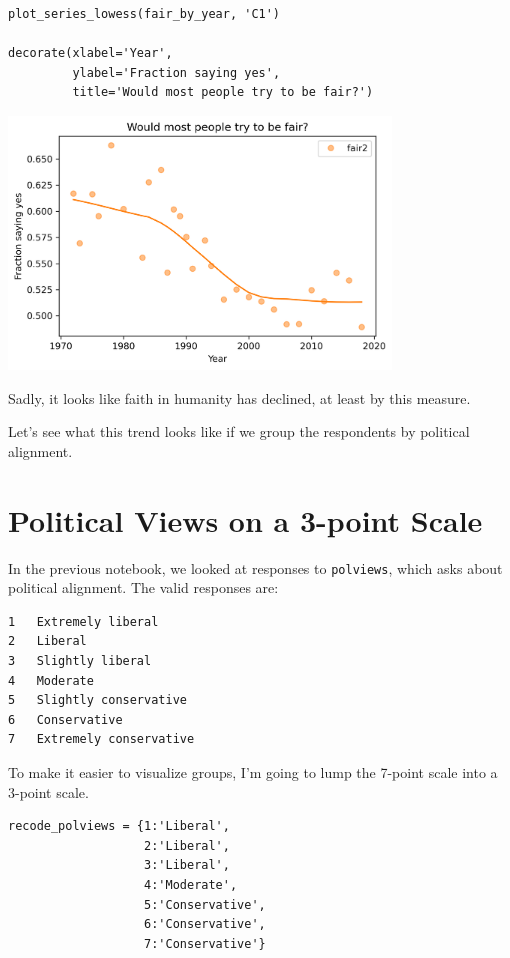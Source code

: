 \begin{lstlisting}[]
plot_series_lowess(fair_by_year, 'C1')

decorate(xlabel='Year',
         ylabel='Fraction saying yes',
         title='Would most people try to be fair?')
\end{lstlisting}

\begin{center}
\includegraphics[width=4in]{chapters/03_outlook_files/03_outlook_32_0.png}
\end{center}

Sadly, it looks like faith in humanity has declined, at least by this
measure.

Let's see what this trend looks like if we group the respondents by
political alignment.

\hypertarget{political-views-on-a-3-point-scale}{%
\section{Political Views on a 3-point
Scale}\label{political-views-on-a-3-point-scale}}

In the previous notebook, we looked at responses to
\passthrough{\lstinline!polviews!}, which asks about political
alignment. The valid responses are:

\begin{lstlisting}
1   Extremely liberal
2   Liberal
3   Slightly liberal
4   Moderate
5   Slightly conservative
6   Conservative
7   Extremely conservative
\end{lstlisting}

To make it easier to visualize groups, I'm going to lump the 7-point
scale into a 3-point scale.

\begin{lstlisting}[]
recode_polviews = {1:'Liberal', 
                   2:'Liberal', 
                   3:'Liberal', 
                   4:'Moderate', 
                   5:'Conservative', 
                   6:'Conservative', 
                   7:'Conservative'}
\end{lstlisting}

